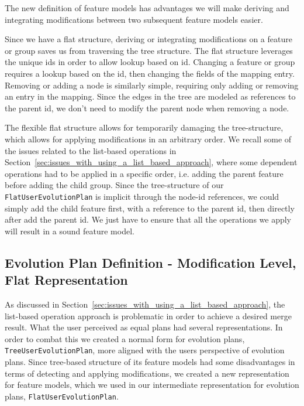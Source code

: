 \documentclass[a4paper,english]{ifimaster}
\begin{document}
The new definition of feature models has advantages we will make deriving and integrating modifications between two subsequent feature models easier. 

Since we have a flat structure, deriving or integrating modifications on a feature or group saves us from traversing the tree structure. The flat structure leverages the unique ids in order to allow lookup based on id. Changing a feature or group requires a lookup based on the id, then changing the fields of the mapping entry. Removing or adding a node is similarly simple, requiring only adding or removing an entry in the mapping. Since the edges in the tree are modeled as references to the parent id, we don't need to modify the parent node when removing a node.

The flexible flat structure allows for temporarily damaging the tree-structure, which allows for applying modifications in an arbitrary order. We recall some of the issues related to the list-based operations in Section~\ref{sec:issues_with_using_a_list_based_approach}, where some dependent operations had to be applied in a specific order, i.e. adding the parent feature before adding the child group. Since the tree-structure of our \texttt{FlatUserEvolutionPlan} is implicit through the node-id references, we could simply add the child feature first, with a reference to the parent id, then directly after add the parent id. We just have to ensure that all the operations we apply will result in a sound feature model.

\subsection{Evolution Plan Definition - Modification Level, Flat Representation}%
\label{sub:evolution_plan_definition_modification_level_flat_representation}

As discussed in Section~\ref{sec:issues_with_using_a_list_based_approach}, the list-based operation approach is problematic in order to achieve a desired merge result. What the user perceived as equal plans had several representations. In order to combat this we created a normal form for evolution plans, \texttt{TreeUserEvolutionPlan}, more aligned with the users perspective of evolution plans. Since tree-based structure of its feature models had some disadvantages in terms of detecting and applying modifications, we created a new representation for feature models, which we used in our intermediate representation for evolution plans, \texttt{FlatUserEvolutionPlan}.
\end{document}
